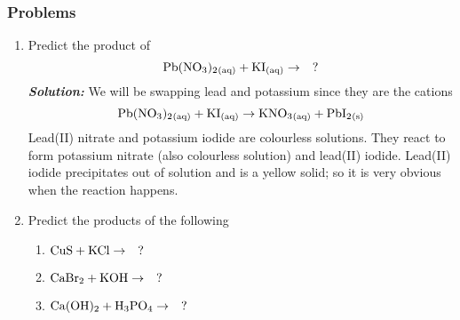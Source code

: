 \documentclass[12pt]{report}
\begin{document}
\subsubsection{Problems}
\begin{enumerate}
\setlength\itemsep{0.5em}
    \item{Predict the product of 
            \[
                \ce{Pb(NO3)2_{(aq)}}+ \ce{KI_{(aq)}}\to\quad?
           \]
        }
        \textit{\textbf{Solution:}} We will be swapping lead and potassium since they are the cations 
        \[
                \ce{Pb(NO3)2_{(aq)}}+ \ce{KI_{(aq)}}\to \ce{KNO3_{(aq)}}+ \ce{PbI2_{(s)}}
        \]
        Lead(II) nitrate and potassium iodide are colourless solutions. They react to form potassium nitrate (also colourless solution) and lead(II) iodide. Lead(II) iodide precipitates out of solution and is a yellow solid; so it is very obvious when the reaction happens.

        \item{Predict the products of the following
                \begin{enumerate}[label=(\alph*)]
                    \item{$ \ce{CuS}+ \ce{KCl}\to\quad?$}
                    \item{$ \ce{CaBr2}+ \ce{KOH}\to\quad?$}
                    \item{$ \ce{Ca(OH)2}+ \ce{H3PO4}\to\quad?$}
                \end{enumerate}
            }


\end{enumerate}
\end{document}
